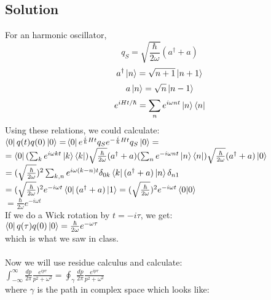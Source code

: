\documentclass{article}
\begin{document}
\subsection*{Solution}
For an harmonic oscillator,\\
\begin{equation} \label{eq:harmonic q}
    q_S=\sqrt{\frac{\hbar}{2\omega}}(a^\dagger + a)
\end{equation}
\begin{equation*}
    a^\dagger\ket{n}=\sqrt{n+1}\ket{n+1}
\end{equation*}
\begin{equation*}
    a\ket{n}=\sqrt{n}\ket{n-1}
\end{equation*}
\begin{equation*}
    e^{iHt/\hbar}=\sum_{n}e^{i\omega nt}\ket{n}\bra{n}
\end{equation*}
Using these relations, we could calculate:\\
$\bra{0}q(t)q(0)\ket{0}=$$\bra{0}e^{\frac{i}{\hbar} H t}q_Se^{-\frac{i}{\hbar}Ht}q_S\ket{0}=$\\
$=\bra{0}(\sum_{k}e^{i\omega kt}\ket{k}\bra{k})\sqrt{\frac{\hbar}{2\omega}}(a^\dagger + a)(\sum_{n}e^{-i\omega nt}\ket{n}\bra{n})\sqrt{\frac{\hbar}{2\omega}}(a^\dagger + a)\ket{0}$\\
$=(\sqrt{\frac{\hbar}{2\omega}})^2\sum_{k,n}e^{i\omega (k-n)t}\delta_{0 k}\bra{k}(a^\dagger + a)\ket{n}\delta_{n 1} $\\
$=(\sqrt{\frac{\hbar}{2\omega}})^2e^{-i\omega t}\bra{0}(a^\dagger + a)\ket{1}=(\sqrt{\frac{\hbar}{2\omega}})^2e^{-i\omega t}\braket{0}$\\
$=\boxed{\frac{\hbar}{2\omega}e^{-i\omega t}}$\\
If we do a Wick rotation by $t=-i\tau$, we get:\\
$\bra{0}q(\tau)q(0)\ket{0}=\frac{\hbar}{2\omega}e^{-\omega \tau}$\\
which is what we saw in class.\\\\
Now we will use residue calculus and calculate:\\
$\int_{-\infty}^{\infty}\frac{dp}{2\pi}\frac{e^{ip\tau}}{p^2+\omega^2}=\oint_\gamma\frac{dp}{2\pi}\frac{e^{ip\tau}}{p^2+\omega^2}$\\
where $\gamma$ is the path in complex space which looks like:\\
\end{document}

